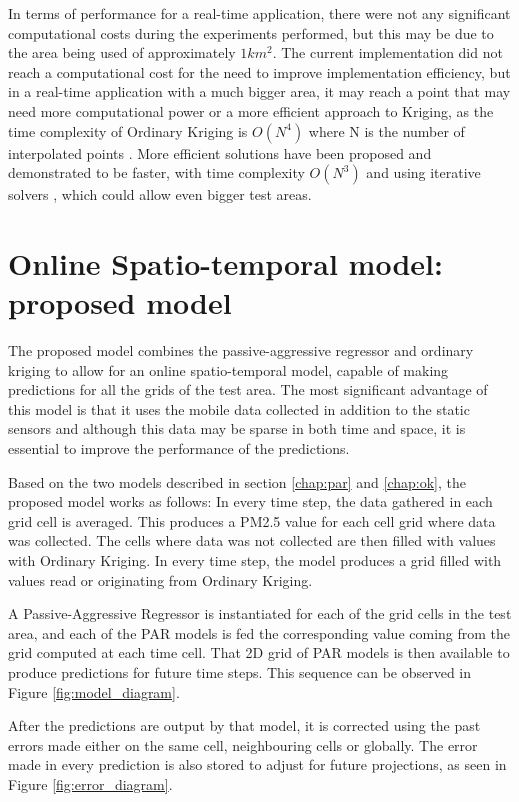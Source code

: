 In terms of performance for a real-time application, there were not any significant computational costs during the experiments performed, but this may be due to the area being used of approximately $1 km^2$. The current implementation did not reach a computational cost for the need to improve implementation efficiency, but in a real-time application with a much bigger area, it may reach a point that may need more computational power or a more efficient approach to Kriging, as the time complexity of Ordinary Kriging is $O(N^4)$ where N is the number of interpolated points \cite{efficientkriging}. More efficient solutions have been proposed and demonstrated to be faster, with time complexity $O(N^3)$ and using iterative solvers \cite{efficientkriging}, which could allow even bigger test areas.

\section{Online Spatio-temporal model: proposed model}

The proposed model combines the passive-aggressive regressor and ordinary kriging to allow for an online spatio-temporal model, capable of making predictions for all the grids of the test area. The most significant advantage of this model is that it uses the mobile data collected in addition to the static sensors and although this data may be sparse in both time and space, it is essential to improve the performance of the predictions.

Based on the two models described in section \ref{chap:par} and \ref{chap:ok}, the proposed model works as follows: In every time step, the data gathered in each grid cell is averaged. This produces a PM2.5 value for each cell grid where data was collected. The cells where data was not collected are then filled with values with Ordinary Kriging. In every time step, the model produces a grid filled with values read or originating from Ordinary Kriging. 

A Passive-Aggressive Regressor is instantiated for each of the grid cells in the test area, and each of the PAR models is fed the corresponding value coming from the grid computed at each time cell. That 2D grid of PAR models is then available to produce predictions for future time steps. This sequence can be observed in Figure \ref{fig:model_diagram}.

After the predictions are output by that model, it is corrected using the past errors made either on the same cell, neighbouring cells or globally. The error made in every prediction is also stored to adjust for future projections, as seen in Figure \ref{fig:error_diagram}. 

